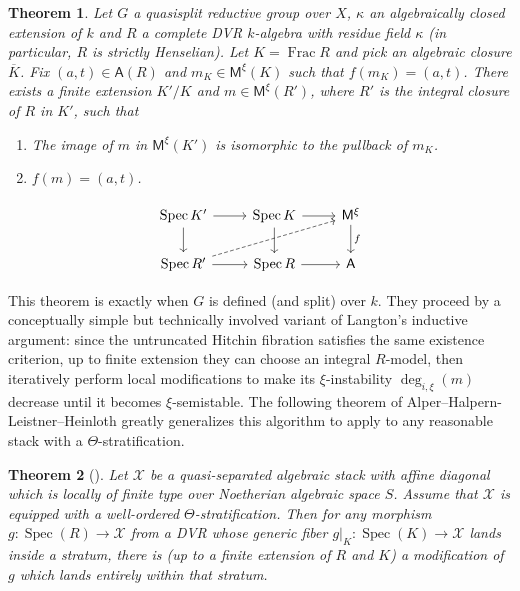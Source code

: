 \documentclass[openany]{amsbook}
\newtheorem{theorem}{Theorem}[chapter]
\theoremstyle{definition}
\theoremstyle{remark}
\numberwithin{equation}{section}
\newcommand{\cX}{\mathcal{X}}
\newcommand{\ol}[1]{\overline{#1}}
\renewcommand{\-}{\operatorname{-}}
\newcommand{\Spec}{\operatorname{Spec}}
\newcommand{\on}[1]{\operatorname{#1}}
\newcommand{\bM}{\mathsf{M}}
\newcommand{\bA}{\mathsf{A}}
\begin{document}
\begin{theorem}\label{thm.val.crit.exist}
    Let $G$ a quasisplit reductive group over $X$, $\kappa$ an algebraically closed extension of $k$ and $R$ a complete DVR $k$-algebra with residue field $\kappa$ (in particular, $R$ is strictly Henselian). Let $K = \on{Frac} R$ and pick an algebraic closure $\ol{K}$. Fix $(a, t) \in \bA(R)$ and $m_{K} \in \bM^\xi(K)$ such that $f(m_{K}) = (a,t)$. There exists a finite extension $K'/K$ and $m \in \bM^{\xi}(R')$, where $R'$ is the integral closure of $R$ in $K'$, such that
    \begin{enumerate}
        \item The image of $m$ in $\bM^\xi(K')$ is isomorphic to the pullback of $m_K$.
        \item $f(m) = (a,t)$.
\end{enumerate}\end{theorem}
    \[
        \begin{tikzcd}[ampersand replacement=\&]
            \Spec K' \ar[r] \ar[d] \& \Spec K \ar[r] \ar[d] \& \bM^\xi \ar[d, "f"] \\ 
            \Spec R' \ar[rru, dashed] \ar[r] \& \Spec R \ar[r] \& \bA
        \end{tikzcd}
    \]

This theorem is exactly \cite[Th\'{e}or\`{e}m 8.1.1]{CLI} when $G$ is defined (and split) over $k$. They proceed by a conceptually simple but technically involved variant of Langton's inductive argument: since the untruncated Hitchin fibration satisfies the same existence criterion, up to finite extension they can choose an integral $R$-model, then iteratively perform local modifications to make its $\xi$-instability $\deg_{i,\xi}(m)$ decrease until it becomes $\xi$-semistable. The following theorem of Alper--Halpern-Leistner--Heinloth greatly generalizes this algorithm to apply to any reasonable stack with a $\Theta$-stratification. 

\begin{theorem}[{{\cite[Theorem 6.5]{AHLHModuliForStacks}}}]
    Let $\cX$ be a quasi-separated algebraic stack with affine diagonal which is locally of finite type over Noetherian algebraic space $S$. Assume that $\cX$ is equipped with a well-ordered $\Theta$-stratification. Then for any morphism $g : \Spec(R) \to \cX$ from a DVR whose generic fiber $g|_K : \Spec(K) \to \cX$ lands inside a stratum, there is (up to a finite extension of $R$ and $K$) a modification of $g$ which lands entirely within that stratum. 
    
    \end{theorem}
\end{document}

